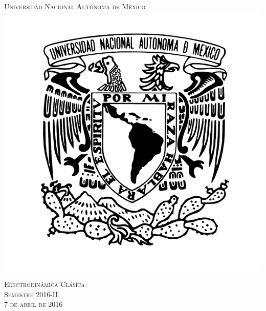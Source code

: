 \documentclass[a4paper,11pt]{article}
\numberwithin{equation}{section}
\begin{document}
\begin{titlepage}
\thispagestyle{fancy}

\newcommand{\HRule}{\rule{\linewidth}{0.5mm}} %

\center %
 

\textsc{\LARGE Universidad Nacional Autónoma de México}\\[0.3cm] %


\includegraphics[scale=0.17]{unam}


\textsc{\Large Electrodinámica Clásica}\\[0.3cm] %
\textsc{\large Semestre 2016-II}\\[0.3cm] %
\textsc{\large 7 de abril de 2016}\\ %


\end{titlepage}
\end{document}
